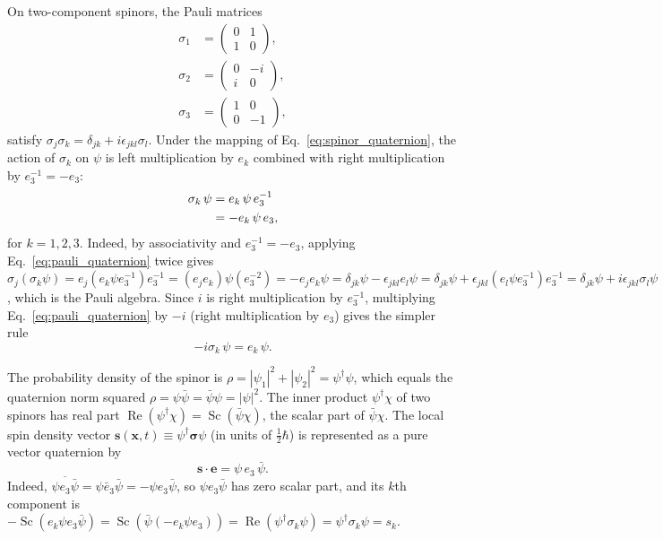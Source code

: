 \documentclass[aps,prd,onecolumn,tightenlines,nofootinbib,notitlepage,11pt,floatfix]{revtex4-2}
\theoremstyle{indentedtheorem}
\begin{document}
On two-component spinors, the Pauli matrices~\citep{Pauli1927Magnetischen}
\begin{align}
    \sigma_1 &= \begin{pmatrix} 0 & 1 \\ 1 & 0 \end{pmatrix} , \nonumber \\
    \sigma_2 &= \begin{pmatrix} 0 & -i \\ i & 0 \end{pmatrix} , \nonumber \\
    \sigma_3 &= \begin{pmatrix} 1 & 0 \\ 0 & -1 \end{pmatrix} ,
    \label{eq:pauli_matrices}
\end{align}
satisfy $\sigma_j\sigma_k = \delta_{jk} + i\epsilon_{jkl}\sigma_l$. Under the mapping of Eq.~\eqref{eq:spinor_quaternion}, the action of $\sigma_k$ on $\psi$ is left multiplication by $e_k$ combined with right multiplication by $e_3^{-1}=-e_3$:
\begin{align}
    \sigma_k \, \psi &= e_k \, \psi \, e_3^{-1} \notag\\
    &= -e_k \, \psi \, e_3 ,
    \label{eq:pauli_quaternion}
\end{align}
for $k=1,2,3$. Indeed, by associativity and $e_3^{-1}=-e_3$, applying Eq.~\eqref{eq:pauli_quaternion} twice gives $\sigma_j(\sigma_k\psi) = e_j(e_k\psi e_3^{-1})e_3^{-1} = (e_je_k)\psi(e_3^{-2}) = -e_je_k\psi = \delta_{jk}\psi - \epsilon_{jkl}e_l\psi = \delta_{jk}\psi + \epsilon_{jkl}(e_l\psi e_3^{-1})e_3^{-1} = \delta_{jk}\psi + i\epsilon_{jkl}\sigma_l\psi$, which is the Pauli algebra. Since $i$ is right multiplication by $e_3^{-1}$, multiplying Eq.~\eqref{eq:pauli_quaternion} by $-i$ (right multiplication by $e_3$) gives the simpler rule
\begin{equation}
    -i\sigma_k\,\psi = e_k\,\psi .
    \label{eq:minus_i_sigma}
\end{equation}

The probability density of the spinor is $\rho = |\psi_1|^2 + |\psi_2|^2 = \psi^\dagger\psi$, which equals the quaternion norm squared $\rho = \psi\bar{\psi} = \bar{\psi}\psi = |\psi|^2$. The inner product $\psi^\dagger\chi$ of two spinors has real part $\operatorname{Re}(\psi^\dagger\chi) = \operatorname{Sc}(\bar{\psi}\chi)$, the scalar part of $\bar{\psi}\chi$. The local spin density vector $\mathbf{s}(\mathbf{x},t) \equiv \psi^\dagger\boldsymbol{\sigma}\psi$ (in units of $\tfrac{1}{2}\hbar$) is represented as a pure vector quaternion by
\begin{equation}
    \mathbf{s}\cdot\mathbf{e} = \psi \, e_3 \, \bar{\psi} .
    \label{eq:spin_vector}
\end{equation}
Indeed, $\overline{\psi e_3\bar{\psi}} = \psi\bar{e}_3\bar{\psi} = -\psi e_3\bar{\psi}$, so $\psi e_3\bar{\psi}$ has zero scalar part, and its $k$th component is $-\operatorname{Sc}(e_k\psi e_3\bar{\psi}) = \operatorname{Sc}(\bar{\psi}(-e_k\psi e_3)) = \operatorname{Re}(\psi^\dagger\sigma_k\psi) = \psi^\dagger\sigma_k\psi = s_k$.
\end{document}
